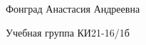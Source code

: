 Фонград Анастасия Андреевна
\begin{DoxyItemize}
\item Учебная группа КИ21-\/16/1б 
\end{DoxyItemize}